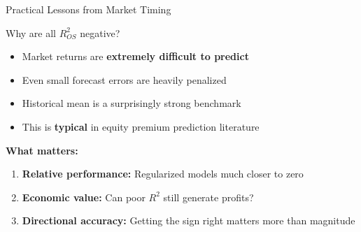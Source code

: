 \documentclass[10pt]{beamer}
\newcommand{\highlight}[1]{\textcolor{AccentOrange}{\textbf{#1}}}
\begin{document}
\begin{frame}{Practical Lessons from Market Timing}

 \begin{block}{Why are all $R^2_{OS}$ negative?}
    \begin{itemize}
      \item Market returns are \highlight{extremely difficult to predict}
      \item Even small forecast errors are heavily penalized
      \item Historical mean is a surprisingly strong benchmark
      \item This is \highlight{typical} in equity premium prediction literature
    \end{itemize}
  \end{block}
  
  \vspace{1em}
  \textbf{What matters:}
  \begin{enumerate}
    \item \highlight{Relative performance:} Regularized models much closer to zero
    \item \highlight{Economic value:} Can poor $R^2$ still generate profits?
    \item \highlight{Directional accuracy:} Getting the sign right matters more than magnitude
  \end{enumerate}

\end{frame}
\end{document}
